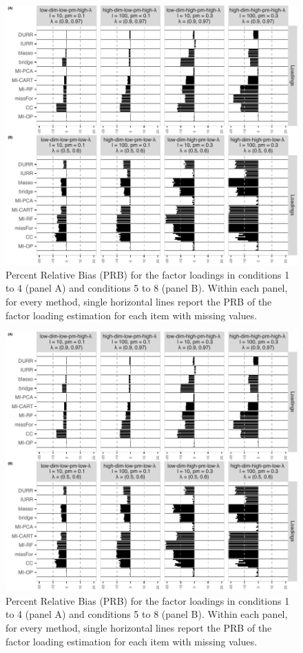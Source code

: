 \documentclass[11pt]{article}
\begin{document}
\begin{figure}
	\includegraphics{../../output/graphs/exp2_CFA_lambda_BPR.pdf}
	\caption{
		Percent Relative Bias (PRB) for the factor loadings in conditions 1 to 4 (panel A) 
		and conditions 5 to 8 (panel B).
		Within each panel, for every method, single horizontal lines report the PRB of the 
		factor loading estimation for each item with missing values.
		}
\label{fig:exp2fl14}
\end{figure}

\begin{figure}
	\includegraphics{../../output/graphs/exp2_CFA_lambda_BPR.pdf}
	\caption{
		Percent Relative Bias (PRB) for the factor loadings in conditions 1 to 4 (panel A) 
		and conditions 5 to 8 (panel B).
		Within each panel, for every method, single horizontal lines report the PRB of the 
		factor loading estimation for each item with missing values.
		}
\label{fig:exp2fl14}
\end{figure}
\end{document}
